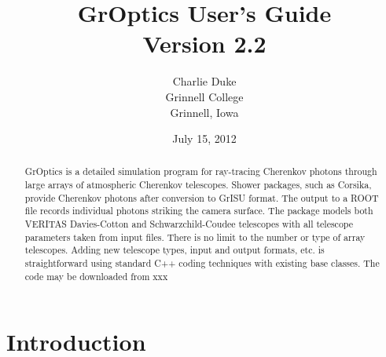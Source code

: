 \documentclass{article}
\begin{document}
\title{GrOptics User's Guide \\ Version 2.2}
\author{Charlie Duke \\
Grinnell College \\
Grinnell, Iowa }
\date{July 15, 2012}

\maketitle
\begin{abstract}
GrOptics is a detailed simulation program for ray-tracing Cherenkov photons
through large arrays of atmospheric Cherenkov telescopes. Shower packages, such
 as Corsika, provide Cherenkov photons after conversion to GrISU format. 
The output to a ROOT file records
individual photons striking the camera surface.  The package models
both VERITAS Davies-Cotton and Schwarzchild-Coudee telescopes with all
telescope parameters taken from input files. There is no limit to the number
or type of array telescopes. Adding new telescope types, input and
output formats, etc. is 
straightforward using standard C++ coding techniques with existing base
classes. The code may be downloaded from xxx
       
\end{abstract}
\section{Introduction}
\end{document}
